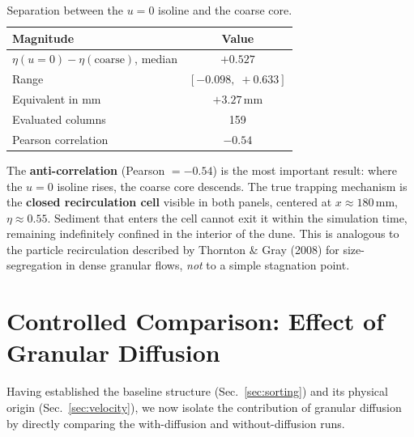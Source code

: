 \documentclass[12pt, a4paper]{article}
\begin{document}
\begin{table}[H]
    \centering
    \begin{tabular}{lc}
        \toprule
        Magnitude & Value \\
        \midrule
        $\eta(u=0) - \eta(\text{coarse})$, median & $+0.527$ \\
        Range & $[-0.098,\; +0.633]$ \\
        Equivalent in mm & $+3.27$\,mm \\
        Evaluated columns & 159 \\
        Pearson correlation & $-0.54$ \\
        \bottomrule
    \end{tabular}
    \caption{Separation between the $u=0$ isoline and the coarse core.}
    \label{tab:F2}
\end{table}

The \textbf{anti-correlation} (Pearson $= -0.54$) is the most important
result: where the $u=0$ isoline rises, the coarse core descends. The true
trapping mechanism is the \textbf{closed recirculation cell} visible in both
panels, centered at $x \approx 180$\,mm, $\eta \approx 0.55$. Sediment
that enters the cell cannot exit it within the simulation time, remaining
indefinitely confined in the interior of the dune. This is analogous to the
particle recirculation described by Thornton \& Gray (2008) for
size-segregation in dense granular flows, \emph{not} to a simple stagnation
point.

\newpage
\section{Controlled Comparison: Effect of Granular Diffusion}
\label{sec:diffusion}

Having established the baseline structure (Sec.~\ref{sec:sorting}) and its
physical origin (Sec.~\ref{sec:velocity}), we now isolate the contribution
of granular diffusion by directly comparing the with-diffusion and
without-diffusion runs.
\end{document}
